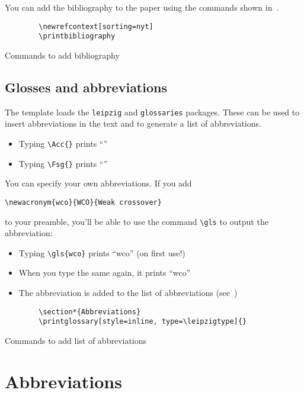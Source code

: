 You can add the bibliography to the paper using the commands shown in~.

\begin{listing}[H]
    \begin{verbatim}
        \newrefcontext[sorting=nyt]
        \printbibliography
    \end{verbatim}
    \caption{Commands to add bibliography}\label{lst:bibliography}
\end{listing}

\subsection{Glosses and abbreviations}

The template loads the \texttt{leipzig} and \texttt{glossaries} packages. These can
be used to insert abbreviations in the text and to generate a list of abbreviations.

\begin{itemize}
    \item Typing \verb+\Acc{}+ prints \enquote{\Acc}
    \item Typing \verb+\Fsg{}+ prints \enquote{\Fsg}
\end{itemize}

You can specify your own abbreviations. If you add

\begin{verbatim}
\newacronym{wco}{WCO}{Weak crossover}
\end{verbatim}

to your preamble, you'll be able to use the command \verb+\gls+ to output the
abbreviation:

\begin{itemize}
    \item Typing \verb+\gls{wco}+ prints \enquote{\gls{wco}} (on first use!)
    \item When you type the same again, it prints \enquote{\gls{wco}}
    \item The abbreviation is added to the list of abbreviations
    (see~)
\end{itemize}

\begin{listing}[H]
    \begin{verbatim}
        \section*{Abbreviations}
        \printglossary[style=inline, type=\leipzigtype]{}
    \end{verbatim}
    \caption{Commands to add list of abbreviations}\label{lst:abbreviations}
\end{listing}

\section*{Abbreviations}
\printglossary[style=inline, type=\leipzigtype]{}

\newrefcontext[sorting=nyt]
\printbibliography

